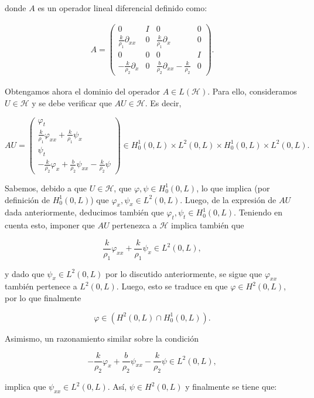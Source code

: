donde $A$ es un operador lineal diferencial definido como:

\begin{align}
    \label{operadorATimoBasico}
    A = 
    \begin{pmatrix}
        0 & I & 0 & 0\\
        \frac{k}{\rho_1}\partial_{xx} & 0 & \frac{k}{\rho_1}\partial_x & 0\\
        0 & 0 & 0 & I\\
        -\frac{k}{\rho_2}\partial_x & 0 & \frac{b}{\rho_2}\partial_{xx} - \frac{k}{\rho_2} & 0
    \end{pmatrix}.
\end{align}

Obtengamos ahora el dominio del operador $A \in L(\mathcal{H})$. Para ello, consideramos $U \in \mathcal{H}$ y se debe verificar que $AU \in \mathcal{H}$. Es decir,

\[AU = 
\begin{pmatrix}
    \varphi_t\\
    \frac{k}{\rho_1}\varphi_{xx} + \frac{k}{\rho_1}\psi_{x}\\ 
    \psi_t\\
    -\frac{k}{\rho_2}\varphi_x + \frac{b}{\rho_2}\psi_{xx} - \frac{k}{\rho_2}\psi
\end{pmatrix} \in H_0^1(0,L) \times L^2(0,L) \times H_0^1(0,L) \times L^2(0,L).\]

Sabemos, debido a que $U \in \mathcal{H}$, que $\varphi, \psi \in H_0^1(0,L)$, lo que implica (por definición de $H_0^1(0,L)$) que $\varphi_{x}, \psi_{x} \in L^2(0,L)$. Luego, de la expresión de $AU$ dada anteriormente, deducimos también que $\varphi_t, \psi_t \in H_0^1(0,L)$. Teniendo en cuenta esto, imponer que $AU$ pertenezca a $\mathcal{H}$ implica también que

\[
    \frac{k}{\rho_1}\varphi_{xx} + \frac{k}{\rho_1}\psi_{x} \in L^2(0,L),
\]

y dado que $\psi_{x} \in L^2(0,L)$ por lo discutido anteriormente, se sigue que $\varphi_{xx}$ también pertenece a $L^2(0,L)$. Luego, esto se traduce en que $\varphi \in H^2(0,L)$, por lo que finalmente 

\[\varphi \in \left(H^2(0,L) \cap H_0^1(0,L) \right).\]

Asimismo, un razonamiento similar sobre la condición

\[
    -\frac{k}{\rho_2}\varphi_x + \frac{b}{\rho_2}\psi_{xx} - \frac{k}{\rho_2}\psi \in L^2(0,L),
\]

implica que $\psi_{xx} \in L^2(0,L)$. Así, $\psi \in H^2(0,L)$ y finalmente se tiene que:

